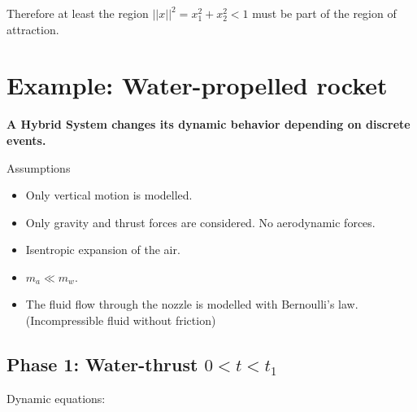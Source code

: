 \documentclass[10pt,a4paper]{scrartcl}
\begin{document}
\begin{multicols*}{3}
Therefore at least the region $||x||^2=x_1^2+x_2^2<1$ must be part of the region of attraction.


\vfill
\null
\newpage

\section{Example: Water-propelled rocket}




\textbf{A Hybrid System changes its dynamic behavior depending on discrete events.}

\finn

Assumptions
\begin{itemize}
\item Only vertical motion is modelled.
\item Only gravity and thrust forces are considered. No aerodynamic forces.
\item Isentropic expansion of the air.
\item $m_a\ll m_w$.
\item The fluid flow through the nozzle is modelled with Bernoulli's law. (Incompressible fluid without friction)
\end{itemize}

\vfill
\null
\columnbreak

\subsection{Phase 1: Water-thrust $0<t<t_1$}




Dynamic equations:


\end{multicols*}
\end{document}
